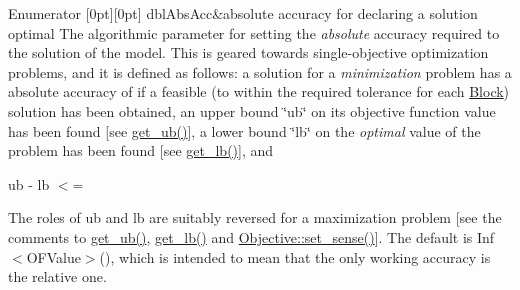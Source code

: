 \begin{DoxyEnumFields}{Enumerator}
[0pt][0pt]{}\mbox{\label{class_s_m_spp__di__unipi__it_1_1_solver_ace6215148d1e3c41a8844f6d692ee132aafe17e0e4a531284760badf1ad8f34d4}} 
dbl\+Abs\+Acc&absolute accuracy for declaring a solution optimal The algorithmic parameter for setting the {\itshape absolute} accuracy required to the solution of the model. This is geared towards single-\/objective optimization problems, and it is defined as follows\+: a solution for a {\itshape minimization} problem has a absolute accuracy of  if a feasible (to within the required tolerance for each \mbox{\hyperlink{class_s_m_spp__di__unipi__it_1_1_block}{Block}}) solution has been obtained, an upper bound \char`\"{}ub\char`\"{} on its objective function value has been found \mbox{[}see \mbox{\hyperlink{class_s_m_spp__di__unipi__it_1_1_solver_a7304d819b2eeff3d4ba650055b24e3a5}{get\+\_\+ub()}}\mbox{]}, a lower bound \char`\"{}lb\char`\"{} on the {\itshape optimal} value of the problem has been found \mbox{[}see \mbox{\hyperlink{class_s_m_spp__di__unipi__it_1_1_solver_a4a4dbe4c2416d531c4619ca94fc07d31}{get\+\_\+lb()}}\mbox{]}, and

ub -\/ lb $<$= 

The roles of ub and lb are suitably reversed for a maximization problem \mbox{[}see the comments to \mbox{\hyperlink{class_s_m_spp__di__unipi__it_1_1_solver_a7304d819b2eeff3d4ba650055b24e3a5}{get\+\_\+ub()}}, \mbox{\hyperlink{class_s_m_spp__di__unipi__it_1_1_solver_a4a4dbe4c2416d531c4619ca94fc07d31}{get\+\_\+lb()}} and \mbox{\hyperlink{class_s_m_spp__di__unipi__it_1_1_objective_ac8a312b13d860de392750856449ef2a8}{Objective\+::set\+\_\+sense()}}\mbox{]}. The default is Inf$<$\+O\+F\+Value$>$(), which is intended to mean that the only working accuracy is the relative one. \\
\hline


\end{DoxyEnumFields}
